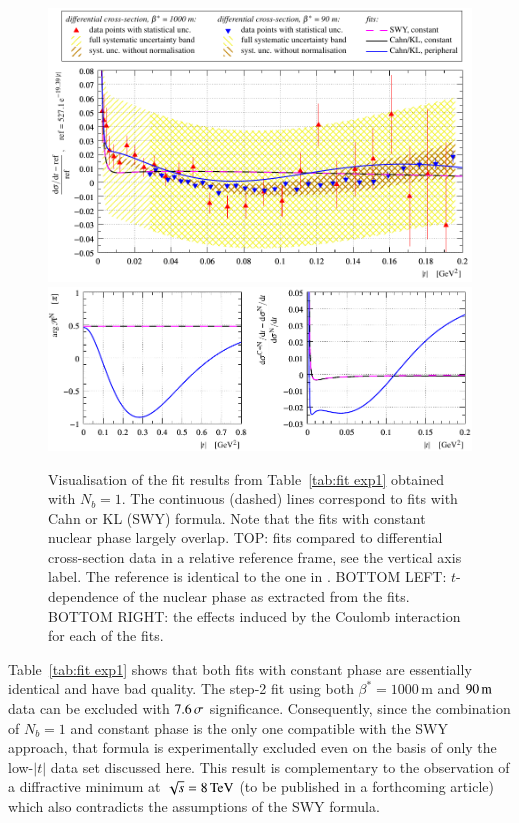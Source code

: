 \begin{figure}
\begin{center}
\includegraphics{fig/fit_exp1/t_dist_rel_with_fit.pdf}
\includegraphics{fig/fit_exp1/phase_cni_effect.pdf}
\caption{Visualisation of the fit results from Table~\ref{tab:fit exp1} obtained with $N_b=1$. The continuous (dashed) lines correspond to fits with Cahn or KL (SWY) formula. Note that the fits with constant nuclear phase largely overlap.
TOP: fits compared to differential cross-section data in a relative reference frame, see the vertical axis label. The reference is identical to the one in \cite{8tev-90m}. 
BOTTOM LEFT: $t$-dependence of the nuclear phase as extracted from the fits.
BOTTOM RIGHT: the effects induced by the Coulomb interaction for each of the fits.
}%
\label{fig:fit exp1}
\end{center}
\end{figure}

Table~\ref{tab:fit exp1} shows that both fits with constant phase are essentially identical and have bad quality. The step-2 fit using both $\beta^*=1000$\,m and $90\,{\rm m}$ data can be excluded with $7.6\,{\rm \sigma}$ significance. Consequently, since the combination of $N_b=1$ and constant phase is the only one compatible with the SWY approach, that formula is experimentally excluded even on the basis of only the low-$|t|$ data set discussed here. This result is complementary to the observation of a diffractive minimum at $\sqrt{s} = 8\,{\rm TeV}$ (to be published in a forthcoming article) which also contradicts the assumptions of the SWY formula.

